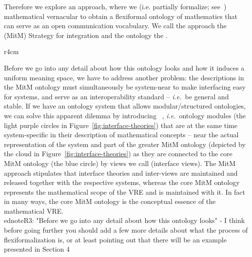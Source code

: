 Therefore we explore an approach, where we  (i.e. partially formalize;
see~\cite{Kohlhase:tffm13}) mathematical vernacular to obtain a flexiformal ontology of
mathematics that can serve as an open communication vocabulary. We call the approach the
 (MitM) Strategy for integration and the ontology the .

\begin{wrapfigure}r{4cm}\vspace*{-1.5em}
  \vspace*{-.5em}
  \caption{Interface theories}\label{fig:interface-theories}\vspace*{-1em}
\end{wrapfigure}
Before we go into any detail about how this ontology looks and how it induces a uniform
meaning space, we have to address another problem: the descriptions in the MitM ontology
must simultaneously be system-near to make interfacing easy for systems, and serve as
an interoperability standard -- \emph{i.e.}\ be general and stable. If we have an ontology system
that allows modular/structured ontologies, we can solve this apparent dilemma by
introducing ~\cite{KohRabSac:fvip11}, \emph{i.e.}\ ontology modules
(the light purple circles in Figure~\ref{fig:interface-theories}) that are at the same
time system-specific in their description of mathematical concepts -- near the actual representation of the
system and part of the greater MitM ontology (depicted by the cloud in
Figure~\ref{fig:interface-theories}) as they are connected to the core MitM ontology (the
blue circle) by views we call  (interface views). 
The MitM approach
stipulates that interface theories and inter-views are maintained and released together with
the respective systems, whereas the core MitM ontology represents the mathematical scope
of the VRE and is maintained with it. In fact in many ways, the core MitM ontology is the
conceptual essence of the mathematical VRE.
\\ednote{R3: "Before we go into any detail about how this ontology looks" - I think before going 
further you should add a few more details about what the process of flexiformalization is, 
or at least pointing out that there will be an example presented in Section 4}

